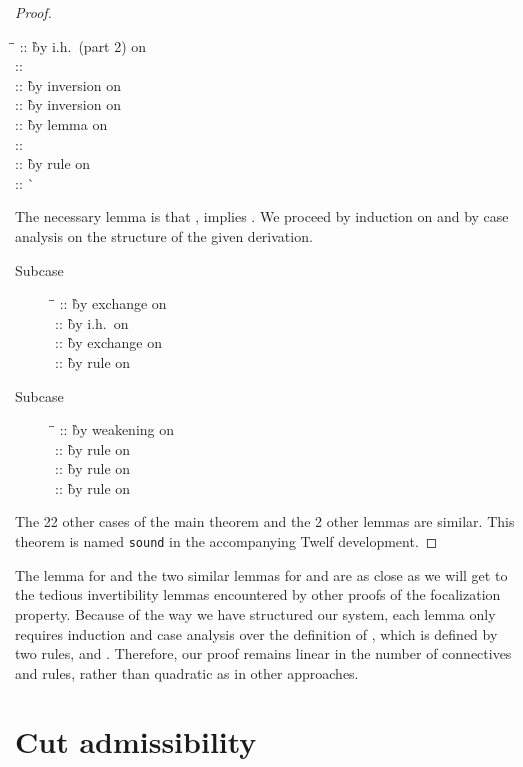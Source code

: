 \documentclass[acmtocl]{robtrans}\pdfoutput=1
\begin{document}
\begin{proof}
\begin{description}
\begin{tabbing}
\qquad \=  \= \kill
\>
 \> :: 
 \` by i.h.~(part 2) on 
\\
\>
 \> :: 
 \` 
\\
\>
 \> :: 
 \` by inversion on  \\
\>
 \> :: 
 \` by inversion on  \\
\>
 \> :: 
 \` by lemma on 
\\
\>
 \> :: 
 \` 
\\
\>
 \> :: 
 \` by rule  on 
\\
\>
 \> :: 
 \` 
\end{tabbing}
\end{description}
The necessary lemma is that ,
implies .
We proceed by induction on  and by case analysis on the
structure of the given derivation.
\begin{description}
\item[Subcase] 
\begin{tabbing}
\qquad \=  \= \kill
\>
 \> :: 
 \` by exchange on \\
\>
 \> :: 
 \` by i.h.~on \\
\>
 \> :: 
 \` by exchange on \\
\>
 \> :: 
 \` by rule  on 
\end{tabbing}
\item[Subcase] 
\begin{tabbing}
\qquad \=  \= \kill
\>
 \> :: 
 \` by weakening on \\
\>
 \> :: 
 \` by rule  on \\
\>
 \> :: 
 \` by rule  on \\
\>
 \> :: 
 \` by rule  on 
\end{tabbing}
\end{description}
The 22 other cases of the main theorem and the 2 other lemmas are
similar.  This theorem is named {\tt sound} in the accompanying Twelf
development.
\end{proof}

The lemma for  and the two similar lemmas for  and
 are as close as we will get to the tedious invertibility
lemmas encountered by other proofs of the focalization property.
Because of the way we have structured our system, each lemma only
requires induction and case analysis over the definition of
, which is defined by two rules, 
and . Therefore, our proof remains linear in the number of
connectives and rules, rather than quadratic as in other approaches.

\section{Cut admissibility}
\label{sec:cut}
\end{document}
